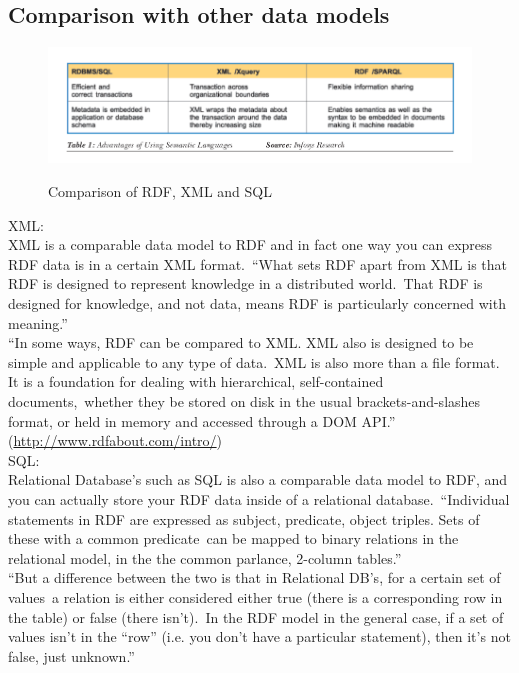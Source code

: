\documentclass[DIV=calc, paper=a4, fontsize=12pt, onecolumn]{scrartcl}	 %
\begin{document}
\subsection{Comparison with other data models}

  \begin{figure}[ht!]
    \centering
    \includegraphics[scale=0.5]{sqlrdf.png}
    \caption{Comparison of RDF, XML and SQL}
    \citep[Fig.~1]{parachuri2008role}
    \label{fig:nwhin}
  \end{figure}  

XML:\\

XML is a comparable data model to RDF and in fact one way you can express RDF data is in a certain XML format.\
``What sets RDF apart from XML is that RDF is designed to represent knowledge in a distributed world.\
That RDF is designed for knowledge, and not data, means RDF is particularly concerned with meaning.''\\

``In some ways, RDF can be compared to XML. XML also is designed to be simple and applicable to any type of data.\
XML is also more than a file format. It is a foundation for dealing with hierarchical, self-contained documents,\
 whether they be stored on disk in the usual brackets-and-slashes format, or held in memory and accessed through a DOM API.''\\

 (\url{http://www.rdfabout.com/intro/})\\

SQL: \\

Relational Database’s such as SQL is also a comparable data model to RDF, and you can actually store your RDF data inside of a relational database.\
``Individual statements in RDF are expressed as subject, predicate, object triples. Sets of these with a common predicate\
 can be mapped to binary relations in the relational model, in the the common parlance, 2-column tables.''\\

``But a difference between the two is that in Relational DB's, for a certain set of values\
a relation is either considered either true (there is a corresponding row in the table) or false (there isn't).\
 In the RDF model in the general case, if a set of values isn't in the ``row'' (i.e. you don't have a particular statement), then it's not false, just unknown.''\\
\end{document}
